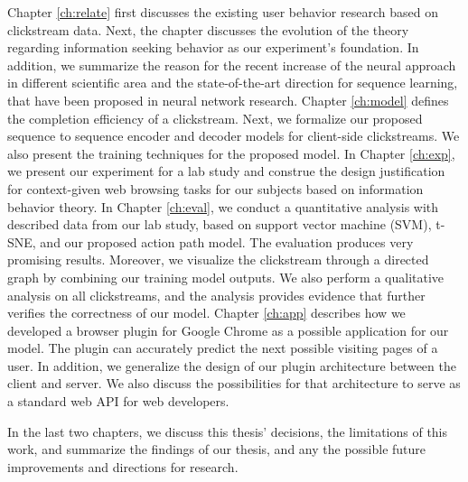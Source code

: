 Chapter \ref{ch:relate} first discusses the existing user behavior research based on clickstream data. 
Next, the chapter discusses the evolution of the theory regarding information seeking behavior 
as our experiment's foundation.
In addition, we summarize the reason for the recent increase of the neural approach 
in different scientific area and the state-of-the-art direction for sequence learning, 
that have been proposed in neural network research.
Chapter \ref{ch:model} defines the completion efficiency of a clickstream. Next, we
formalize our proposed sequence to sequence encoder and decoder models for client-side
clickstreams. We also present the training techniques for the proposed model.
In Chapter \ref{ch:exp}, we present our experiment for a lab study
and construe the design justification for context-given web browsing tasks for our subjects 
based on information behavior theory.
In Chapter \ref{ch:eval},
we conduct a quantitative analysis with described data from our lab study, based on support
vector machine (SVM), t-SNE, and our proposed action path model.
The evaluation produces very promising results.
Moreover, we visualize the clickstream through a directed graph by combining our training model outputs.
We also perform a qualitative analysis on all clickstreams, and the analysis provides evidence 
that further verifies the correctness of our model.
Chapter \ref{ch:app} describes how we developed a browser plugin 
for Google Chrome as a possible application for our model. The plugin can accurately predict 
the next possible visiting pages of a user. 
In addition, we generalize the design of our plugin architecture between the client and server.
We also discuss the possibilities for that architecture to serve as a standard web API 
for web developers.

In the last two chapters, we discuss this thesis' decisions, the limitations of this work, and
summarize the findings of our thesis, and any the possible future improvements and 
directions for research.
\cleardoublepage